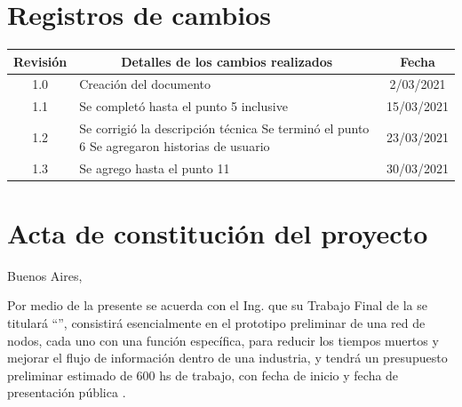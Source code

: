 \documentclass[11pt]{charter}
\begin{document}
\maketitle
\thispagestyle{empty}
\pagebreak


\thispagestyle{empty}
{\setlength{\parskip}{0pt}
\tableofcontents{}
}
\pagebreak


\section{Registros de cambios}
\label{sec:registro}


\begin{table}[ht]
\label{tab:registro}
\centering
\begin{tabularx}{\linewidth}{@{}|c|X|c|@{}}
\hline
\rowcolor[HTML]{C0C0C0} 
Revisión & \multicolumn{1}{c|}{\cellcolor[HTML]{C0C0C0}Detalles de los cambios realizados} & Fecha      \\ \hline
1.0      & Creación del documento                                          & 2/03/2021 \\ \hline
1.1      & Se completó hasta el punto 5 inclusive & 15/03/2021 \\ \hline
1.2      & Se corrigió la descripción técnica\newline
           Se terminó el punto 6\newline
           Se agregaron historias de usuario & 23/03/2021 \\ \hline
1.3      & Se agrego hasta el punto 11      & 30/03/2021  \\ \hline      
\end{tabularx}
\end{table}

\pagebreak



\section{Acta de constitución del proyecto}
\label{sec:acta}

\begin{flushright}
Buenos Aires, \fechaInicioName
\end{flushright}

\vspace{2cm}

Por medio de la presente se acuerda con el Ing. \authorname\hspace{1px} que su Trabajo Final de la \degreename\hspace{1px} se titulará ``\ttitle'', consistirá esencialmente en el prototipo preliminar de una red de nodos, cada uno con una función específica, para reducir los tiempos muertos y mejorar el flujo de información dentro de una industria, y tendrá un presupuesto preliminar estimado de 600 hs de trabajo, con fecha de inicio \fechaInicioName\hspace{1px} y fecha de presentación pública \fechaFinalName.
\end{document}
